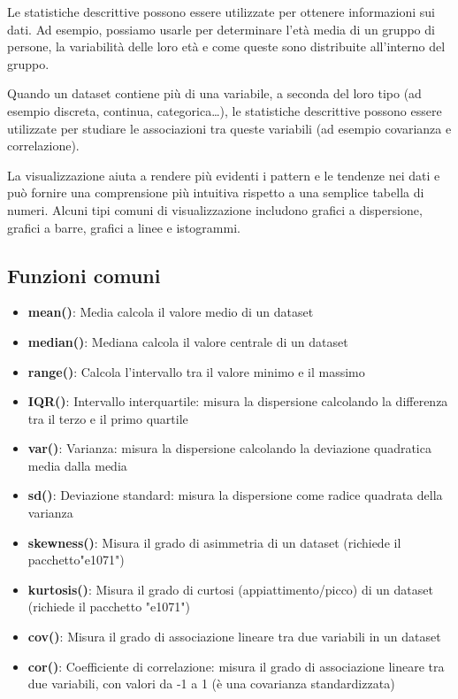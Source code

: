 Le statistiche descrittive possono essere utilizzate per ottenere informazioni sui dati. Ad esempio, possiamo usarle per determinare l’età media di un gruppo di persone, la variabilità delle loro età e come queste sono distribuite all’interno del gruppo.

Quando un dataset contiene più di una variabile, a seconda del loro tipo (ad esempio discreta, continua, categorica…), le statistiche descrittive possono essere utilizzate per studiare le associazioni tra queste variabili (ad esempio covarianza e correlazione).

La visualizzazione aiuta a rendere più evidenti i pattern e le tendenze nei dati e può fornire una comprensione più intuitiva rispetto a una semplice tabella di numeri. Alcuni tipi comuni di visualizzazione includono grafici a dispersione, grafici a barre, grafici a linee e istogrammi.

\subsection{Funzioni comuni}
\begin{itemize}
  \item \textbf{mean()}: Media calcola il valore medio di un dataset
  \item \textbf{median()}: Mediana calcola il valore centrale di un dataset
  \item \textbf{range()}: Calcola l’intervallo tra il valore minimo e il massimo
  \item \textbf{IQR()}: Intervallo interquartile: misura la dispersione calcolando la differenza tra il terzo e il primo quartile
  \item \textbf{var()}: Varianza: misura la dispersione calcolando la deviazione quadratica media dalla media
  \item \textbf{sd()}: Deviazione standard: misura la dispersione come radice quadrata della varianza
  \item \textbf{skewness()}: Misura il grado di asimmetria di un dataset (richiede il pacchetto"e1071")
  \item \textbf{kurtosis()}: Misura il grado di curtosi (appiattimento/picco) di un dataset (richiede il pacchetto "e1071")
  \item \textbf{cov()}: Misura il grado di associazione lineare tra due variabili in un dataset
  \item \textbf{cor()}: Coefficiente di correlazione: misura il grado di associazione lineare tra due variabili, con valori da -1 a 1 (è una covarianza standardizzata)
\end{itemize}

